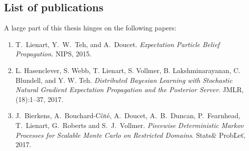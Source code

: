 \subsection*{List of publications}
A large part of this thesis hinges on the following papers:
\begin{enumerate}
	\item T.\ Lienart, Y.\ W.\ Teh, and A.\ Doucet. \emph{Expectation Particle Belief Propagation}. NIPS, 2015. 
	\item L. Hasenclever, S. Webb, T. Lienart, S. Vollmer, B. Lakshminarayanan, C. Blundell, and Y. W. Teh. \emph{Distributed Bayesian Learning with Stochastic Natural Gradient Expectation Propagation and the Posterior Server}. JMLR, (18):1--37, 2017.
	\item J.\ Bierkens, A.\ Bouchard-C\^ot\'e, A.\ Doucet, A.\ B.\ Duncan, P.\ Fearnhead, T.\ Lienart, G.\ Roberts and S.\ J.\ Vollmer. \emph{Piecewise Deterministic Markov Processes for Scalable Monte Carlo on Restricted Domains}. Stats\. \& Prob\. Let\., 2017.
\end{enumerate}


\newpage
